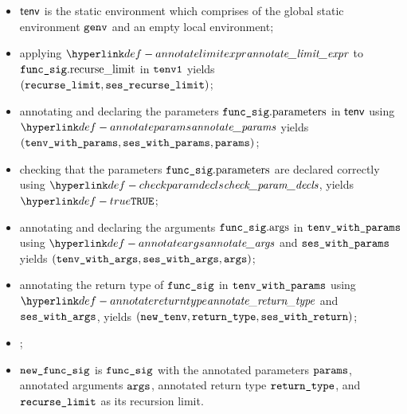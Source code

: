 \ProseParagraph
\AllApply
\begin{itemize}
  \item $\textsf{tenv}$ is the static environment which comprises of the global static environment $\texttt{genv}$ and an empty local environment;
  \item applying $\annotatelimitexpr$ to $\texttt{func\_sig}.\text{recurse\_limit}$ in $\texttt{tenv1}$ yields \\
        $(\texttt{recurse\_limit}, \texttt{ses\_recurse\_limit})$\ProseOrTypeError;
  \item annotating and declaring the parameters $\texttt{func\_sig}.\text{parameters}$ in $\textsf{tenv}$ using \\
        $\annotateparams$ yields $(\texttt{tenv\_with\_params}, \texttt{ses\_with\_params}, \texttt{params})$\ProseOrTypeError;
  \item checking that the parameters $\texttt{func\_sig}.\text{parameters}$ are declared correctly using $\checkparamdecls$, yields $\True$\ProseOrTypeError;
  \item annotating and declaring the arguments $\texttt{func\_sig}.\text{args}$ in $\texttt{tenv\_with\_params}$ using $\annotateargs$
        and $\texttt{ses\_with\_params}$ yields
        $(\texttt{tenv\_with\_args}, \texttt{ses\_with\_args}, \texttt{args})$\ProseOrTypeError;
  \item annotating the return type of $\texttt{func\_sig}$ in $\texttt{tenv\_with\_params}$ using \\ $\annotatereturntype$ and $\texttt{ses\_with\_args}$, yields
        $(\texttt{new\_tenv}, \texttt{return\_type}, \texttt{ses\_with\_return})$\ProseOrTypeError;
  \item {};
  \item $\texttt{new\_func\_sig}$ is $\texttt{func\_sig}$ with the annotated parameters $\texttt{params}$, annotated arguments $\texttt{args}$, annotated return type $\texttt{return\_type}$,
        and $\texttt{recurse\_limit}$ as its recursion limit.
\end{itemize}

